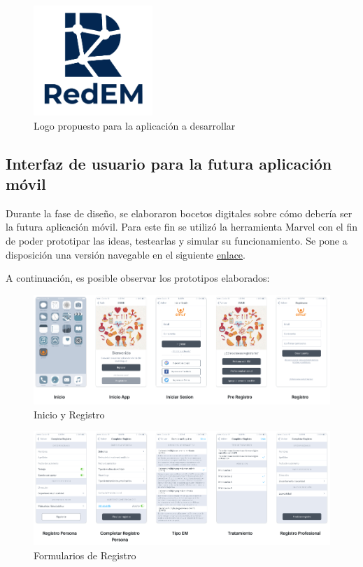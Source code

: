 \begin{figure}[h]
    \centering
    \includegraphics[width=0.4\textwidth]{img/app/red_em.png}
    \caption{Logo propuesto para la aplicación a desarrollar} \label{Img:Logo+APP}
\end{figure} 


\subsection{Interfaz de usuario para la futura aplicación móvil}
Durante la fase de diseño, se elaboraron bocetos digitales sobre cómo debería ser la futura aplicación móvil. Para este fin se utilizó la herramienta Marvel con el fin de poder prototipar las ideas, testearlas y simular su funcionamiento. Se pone a disposición una versión navegable en el siguiente \href{https://marvelapp.com/prototype/c69dgae}{enlace}.

A continuación, es posible observar los prototipos elaborados:

\begin{figure}[h]
    \centering
    \includegraphics[width=1.1\textwidth]{img/app/diseno_parte1.png}
    \caption{Inicio y Registro} \label{Img:Inicio+Registro}
\end{figure} 

\begin{figure}[h]
    \centering
    \includegraphics[width=1.1\textwidth]{img/app/diseno_parte2.png}
    \caption{Formularios de Registro} \label{Img:Formularios+Registro}
\end{figure} 

